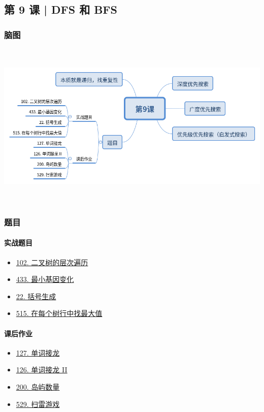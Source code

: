 \subsection{第 9 课 | DFS 和 BFS}

\subsubsection{脑图}

\includegraphics[width=170mm,height=80mm]{images/第9课.png}

\subsubsection{题目}

\paragraph{实战题目}

\begin{itemize}
  \item \hyperref[leetcode:102]{102. 二叉树的层次遍历}
  \item \hyperref[leetcode:433]{433. 最小基因变化}
  \item \hyperref[leetcode:22]{22. 括号生成}
  \item \hyperref[leetcode:515]{515. 在每个树行中找最大值}
\end{itemize}

\paragraph{课后作业}

\begin{itemize}
  \item \hyperref[leetcode:127]{127. 单词接龙}
  \item \hyperref[leetcode:126]{126. 单词接龙 II}
  \item \hyperref[leetcode:200]{200. 岛屿数量}
  \item \hyperref[leetcode:529]{529. 扫雷游戏}
\end{itemize}
